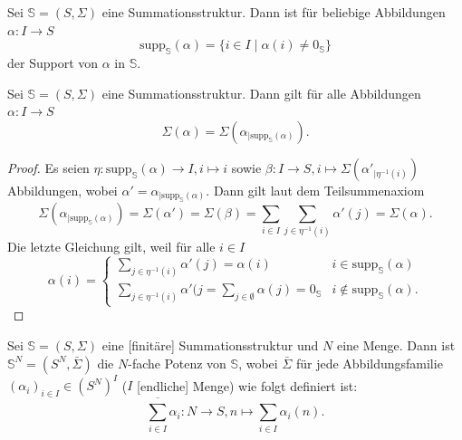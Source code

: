 \documentclass{article}
\begin{document}
\begin{definition}
  Sei $\mathbb{S} = (S, \Sigma)$ eine Summationsstruktur.
  Dann ist für beliebige Abbildungen $\alpha \colon I \to S$
  \begin{equation*}
    \text{supp}_\mathbb{S}(\alpha) = \{i \in I \mid \alpha(i) \neq 0_\mathbb{S}\}
  \end{equation*}
  der Support von $\alpha$ in $\mathbb{S}$.
\end{definition}

\begin{theorem}
  Sei $\mathbb{S} = (S, \Sigma)$ eine Summationsstruktur.
  Dann gilt für alle Abbildungen $\alpha \colon I \to S$
  \begin{equation*}
    \Sigma(\alpha) = \Sigma(\alpha_{\mid \text{supp}_\mathbb{S}(\alpha)}).
  \end{equation*}
\end{theorem}
\begin{proof}
  Es seien 
  $\eta \colon \text{supp}_\mathbb{S}(\alpha) \to I, i \mapsto i$
  sowie $\beta \colon I \to S, i \mapsto \Sigma(\alpha'_{\mid \eta^{-1}(i)})$ Abbildungen,
  wobei $\alpha' = \alpha_{\mid \text{supp}_\mathbb{S}(\alpha)}$.
  Dann gilt laut dem Teilsummenaxiom
  \begin{equation*}
    \Sigma(\alpha_{\mid \text{supp}_\mathbb{S}(\alpha)})
    = \Sigma(\alpha')
    = \Sigma(\beta)
    = \sum_{i \in I} \sum_{j \in \eta^{-1}(i)} \alpha'(j)
    = \Sigma(\alpha).
  \end{equation*}
  Die letzte Gleichung gilt, weil für alle $i \in I$
  \begin{equation*}
    \alpha(i) = 
    \begin{cases}
      \sum_{j \in \eta^{-1}(i)} \alpha'(j) = \alpha(i) & i \in \text{supp}_\mathbb{S}(\alpha) \\
      \sum_{j \in \eta^{-1}(i)} \alpha'(j = \sum_{j \in \emptyset} \alpha(j) = 0_\mathbb{S} & i \notin \text{supp}_\mathbb{S}(\alpha).
    \end{cases}
  \end{equation*}
\end{proof}

\begin{definition}
  Sei $\mathbb{S} = (S, \Sigma)$ eine [finitäre] Summationsstruktur und $N$ eine Menge.
  Dann ist $\mathbb{S}^N = (S^N, \bar\Sigma)$ die $N$-fache Potenz von $\mathbb{S}$,
  wobei $\bar\Sigma$ für jede Abbildungsfamilie $(\alpha_i)_{i \in I} \in (S^N)^I$
  ($I$ [endliche] Menge) wie folgt definiert ist:
  \begin{equation*}
    \overline{\sum_{i \in I}} \alpha_i \colon N \to S, n \mapsto \sum_{i \in I}\alpha_i(n).
  \end{equation*}
\end{definition}
\end{document}
